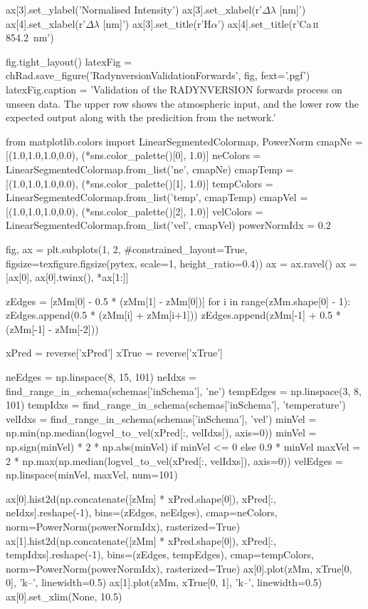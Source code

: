 \begin{pycode}[Radynversion]
ax[3].set_ylabel('Normalised Intensity')
ax[3].set_xlabel(r'$\Delta\lambda$ [\si{\nano\metre}]')
ax[4].set_xlabel(r'$\Delta\lambda$ [\si{\nano\metre}]')
ax[3].set_title(r'H$\alpha$')
ax[4].set_title(r'Ca\,\textsc{ii} \SI{854.2}{\nano\metre}')

fig.tight_layout()
latexFig = chRad.save_figure('RadynversionValidationForwards', fig, fext='.pgf')
latexFig.caption = 'Validation of the RADYNVERSION forwards process on unseen data. The upper row shows the atmospheric input, and the lower row the expected output along with the predicition from the network.'
\end{pycode}

\begin{pycode}[Radynversion]
from matplotlib.colors import LinearSegmentedColormap, PowerNorm
cmapNe = [(1.0,1.0,1.0,0.0), (*sns.color_palette()[0], 1.0)]
neColors = LinearSegmentedColormap.from_list('ne', cmapNe)
cmapTemp = [(1.0,1.0,1.0,0.0), (*sns.color_palette()[1], 1.0)]
tempColors = LinearSegmentedColormap.from_list('temp', cmapTemp)
cmapVel = [(1.0,1.0,1.0,0.0), (*sns.color_palette()[2], 1.0)]
velColors = LinearSegmentedColormap.from_list('vel', cmapVel)
powerNormIdx = 0.2

fig, ax = plt.subplots(1, 2, #constrained_layout=True,
                       figsize=texfigure.figsize(pytex, scale=1, height_ratio=0.4))
ax = ax.ravel()
ax = [ax[0], ax[0].twinx(), *ax[1:]]

zEdges = [zMm[0] - 0.5 * (zMm[1] - zMm[0])]
for i in range(zMm.shape[0] - 1):
    zEdges.append(0.5 * (zMm[i] + zMm[i+1]))
zEdges.append(zMm[-1] + 0.5 * (zMm[-1] - zMm[-2]))

xPred = reverse['xPred']
xTrue = reverse['xTrue']

neEdges = np.linspace(8, 15, 101)
neIdxs = find_range_in_schema(schemas['inSchema'], 'ne')
tempEdges = np.linspace(3, 8, 101)
tempIdxs = find_range_in_schema(schemas['inSchema'], 'temperature')
velIdxs = find_range_in_schema(schemas['inSchema'], 'vel')
minVel = np.min(np.median(logvel_to_vel(xPred[:, velIdxs]), axis=0))
minVel = np.sign(minVel) * 2 * np.abs(minVel) if minVel <= 0 else 0.9 * minVel
maxVel = 2 * np.max(np.median(logvel_to_vel(xPred[:, velIdxs]), axis=0))
velEdges = np.linspace(minVel, maxVel, num=101)

ax[0].hist2d(np.concatenate([zMm] * xPred.shape[0]),
             xPred[:, neIdxs].reshape(-1),
             bins=(zEdges, neEdges), cmap=neColors, norm=PowerNorm(powerNormIdx), rasterized=True)
ax[1].hist2d(np.concatenate([zMm] * xPred.shape[0]),
             xPred[:, tempIdxs].reshape(-1),
             bins=(zEdges, tempEdges), cmap=tempColors, norm=PowerNorm(powerNormIdx), rasterized=True)
ax[0].plot(zMm, xTrue[0, 0], 'k--', linewidth=0.5)
ax[1].plot(zMm, xTrue[0, 1], 'k--', linewidth=0.5)
ax[0].set_xlim(None, 10.5)


\end{pycode}

